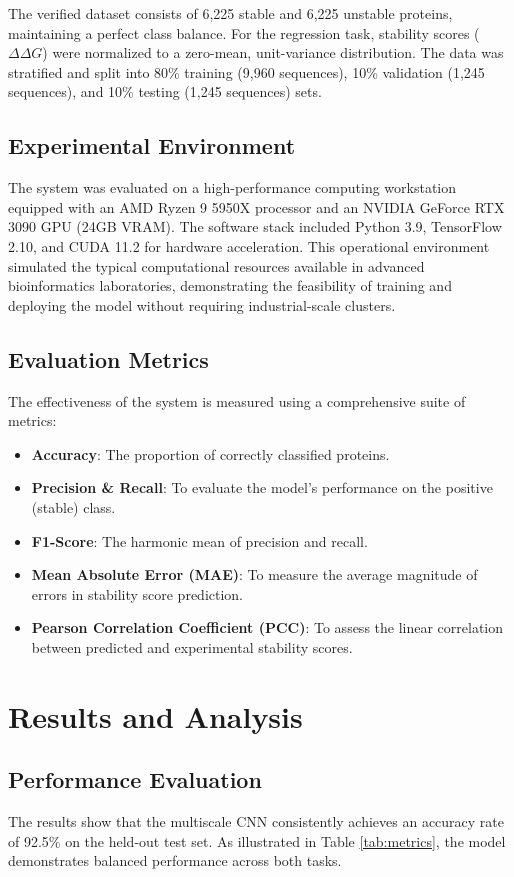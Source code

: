 \documentclass[conference]{IEEEtran}
\begin{document}
The verified dataset consists of 6,225 stable and 6,225 unstable proteins, maintaining a perfect class balance. For the regression task, stability scores ($\Delta\Delta G$) were normalized to a zero-mean, unit-variance distribution. The data was stratified and split into 80\% training (9,960 sequences), 10\% validation (1,245 sequences), and 10\% testing (1,245 sequences) sets.

\subsection{Experimental Environment}
The system was evaluated on a high-performance computing workstation equipped with an AMD Ryzen 9 5950X processor and an NVIDIA GeForce RTX 3090 GPU (24GB VRAM). The software stack included Python 3.9, TensorFlow 2.10, and CUDA 11.2 for hardware acceleration. This operational environment simulated the typical computational resources available in advanced bioinformatics laboratories, demonstrating the feasibility of training and deploying the model without requiring industrial-scale clusters.

\subsection{Evaluation Metrics}
The effectiveness of the system is measured using a comprehensive suite of metrics:
\begin{itemize}
    \item \textbf{Accuracy}: The proportion of correctly classified proteins.
    \item \textbf{Precision \& Recall}: To evaluate the model's performance on the positive (stable) class.
    \item \textbf{F1-Score}: The harmonic mean of precision and recall.
    \item \textbf{Mean Absolute Error (MAE)}: To measure the average magnitude of errors in stability score prediction.
    \item \textbf{Pearson Correlation Coefficient (PCC)}: To assess the linear correlation between predicted and experimental stability scores.
\end{itemize}

\section{Results and Analysis}
\subsection{Performance Evaluation}
The results show that the multiscale CNN consistently achieves an accuracy rate of 92.5\% on the held-out test set. As illustrated in Table \ref{tab:metrics}, the model demonstrates balanced performance across both tasks.
\end{document}
